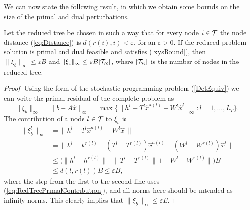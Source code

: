 We can now state the following result, in which we obtain some bounds
on the size of the primal and dual perturbations.
%
\begin{lemma}  \label{th:BoundResiduals}
Let the reduced tree be chosen in such a way that for every node 
$i \in \mathcal{T}$ the node distance (\ref{eq:Distance}) is 
$d(r(i), i) < \varepsilon$, for an $\varepsilon > 0$.
If the reduced problem solution is primal and dual feasible  
and satisfies (\ref{xysBound}), then
$\| \xi_b \|_{\infty} \leq \varepsilon B$
and  $\| \xi_c \|_{\infty} \leq \varepsilon B|\mathcal{T}_\mathcal{R}|$, where
$|\mathcal{T}_\mathcal{R}|$ is the number of nodes in the reduced tree.
\end{lemma} 
%
\begin{proof}
Using the form of the stochastic programming problem (\ref{DetEquiv})
we can write the primal residual of the complete problem as
\[
  \|\xi_b\|_\infty = \|b-A\hat x\|_\infty 
                   = \max\{\|h^{l} - T^{l}\hat x^{a(l)} 
                     - W^{l}\hat x^{l}\|_\infty:l = 1,\ldots,L_T\}.
\]
%
The contribution of a node $l \in \mathcal{T}$ to $\xi_b$ is 
\[
\begin{split}
  \| \xi_b^{l} \|_{\infty}
    & = \|h^{l}\!-\!T^{l}\hat x^{a(l)}\!-\!W^{l}\hat x^{l}\| \\
    & = \|h^{l} \!-\! h^{r(l)} - (T^{l} \!- T^{r(l)})\hat x^{a(l)}
        - (W^{l} - W^{r(l)}) \hat x^{l}\| \\
    & \le \big( \|h^{l} \! - \! h^{r(l)}\| +
           \|T^{l} \! - \! T^{r(l)}\| +
           \|W^{l} \! - \! W^{r(l)}\| \big) B \\
    & \le  d(l, r(l)) B \le \varepsilon B,
\end{split}
\]
where the step from the first to the second line uses 
(\ref{eq:RedTreePrimalContribution}), and all norms here should be
intended as infinity norms.
%
This clearly implies that $\| \xi_b \|_\infty \le \varepsilon B$. 


\end{proof}
